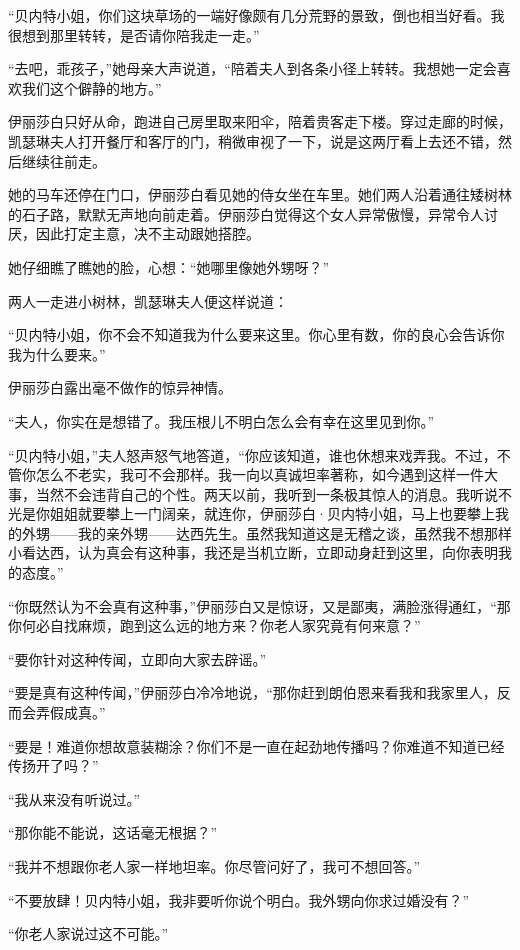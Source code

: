 \par “贝内特小姐，你们这块草场的一端好像颇有几分荒野的景致，倒也相当好看。我很想到那里转转，是否请你陪我走一走。”
\par “去吧，乖孩子，”她母亲大声说道，“陪着夫人到各条小径上转转。我想她一定会喜欢我们这个僻静的地方。”
\par 伊丽莎白只好从命，跑进自己房里取来阳伞，陪着贵客走下楼。穿过走廊的时候，凯瑟琳夫人打开餐厅和客厅的门，稍微审视了一下，说是这两厅看上去还不错，然后继续往前走。
\par 她的马车还停在门口，伊丽莎白看见她的侍女坐在车里。她们两人沿着通往矮树林的石子路，默默无声地向前走着。伊丽莎白觉得这个女人异常傲慢，异常令人讨厌，因此打定主意，决不主动跟她搭腔。
\par 她仔细瞧了瞧她的脸，心想：“她哪里像她外甥呀？”
\par 两人一走进小树林，凯瑟琳夫人便这样说道：
\par “贝内特小姐，你不会不知道我为什么要来这里。你心里有数，你的良心会告诉你我为什么要来。”
\par 伊丽莎白露出毫不做作的惊异神情。
\par “夫人，你实在是想错了。我压根儿不明白怎么会有幸在这里见到你。”
\par “贝内特小姐，”夫人怒声怒气地答道，“你应该知道，谁也休想来戏弄我。不过，不管你怎么不老实，我可不会那样。我一向以真诚坦率著称，如今遇到这样一件大事，当然不会违背自己的个性。两天以前，我听到一条极其惊人的消息。我听说不光是你姐姐就要攀上一门阔亲，就连你，伊丽莎白·贝内特小姐，马上也要攀上我的外甥——我的亲外甥——达西先生。虽然我知道这是无稽之谈，虽然我不想那样小看达西，认为真会有这种事，我还是当机立断，立即动身赶到这里，向你表明我的态度。”
\par “你既然认为不会真有这种事，”伊丽莎白又是惊讶，又是鄙夷，满脸涨得通红，“那你何必自找麻烦，跑到这么远的地方来？你老人家究竟有何来意？”
\par “要你针对这种传闻，立即向大家去辟谣。”
\par “要是真有这种传闻，”伊丽莎白冷冷地说，“那你赶到朗伯恩来看我和我家里人，反而会弄假成真。”
\par “要是！难道你想故意装糊涂？你们不是一直在起劲地传播吗？你难道不知道已经传扬开了吗？”
\par “我从来没有听说过。”
\par “那你能不能说，这话毫无根据？”
\par “我并不想跟你老人家一样地坦率。你尽管问好了，我可不想回答。”
\par “不要放肆！贝内特小姐，我非要听你说个明白。我外甥向你求过婚没有？”
\par “你老人家说过这不可能。”
